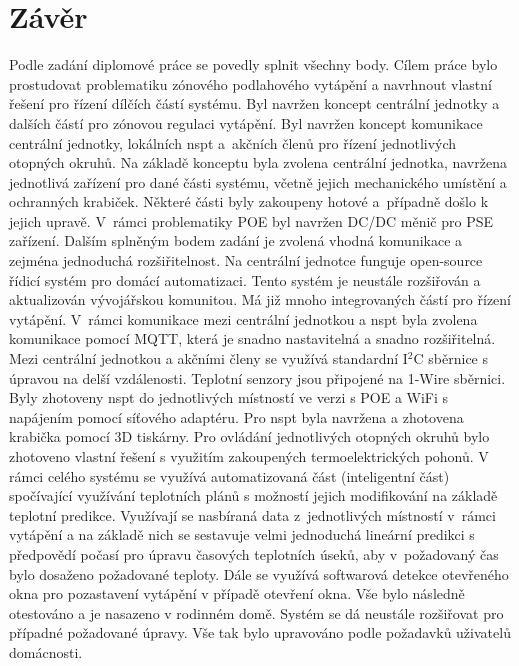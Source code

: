\chapter{Závěr}
Podle zadání diplomové práce se povedly splnit všechny body. Cílem práce bylo prostudovat problematiku zónového podlahového vytápění a navrhnout vlastní řešení pro řízení dílčích částí systému. Byl navržen koncept centrální jednotky a dalších částí pro zónovou regulaci vytápění. Byl navržen koncept komunikace centrální jednotky, lokálních \acrshort{nspt} a~akčních členů pro řízení jednotlivých otopných okruhů. Na základě konceptu byla zvolena centrální jednotka, navržena jednotlivá zařízení pro dané části systému, včetně jejich mechanického umístění a ochranných krabiček. Některé části byly zakoupeny hotové a~případně došlo k jejich upravě. V~rámci problematiky POE byl navržen DC/DC měnič pro PSE zařízení. Dalším splněným bodem zadání je zvolená vhodná komunikace a zejména jednoduchá rozšiřitelnost. Na centrální jednotce funguje open-source řídicí systém pro domácí automatizaci. Tento systém je neustále rozšiřován a aktualizován vývojářskou komunitou. Má již mnoho integrovaných částí pro řízení vytápění. V~rámci komunikace mezi centrální jednotkou a \acrshort{nspt} byla zvolena komunikace pomocí MQTT, která je snadno nastavitelná a snadno rozšiřitelná. Mezi centrální jednotkou a akčními členy se využívá standardní I$^2$C sběrnice s úpravou na delší vzdálenosti. Teplotní senzory jsou připojené na 1-Wire sběrnici. Byly zhotoveny \acrshort{nspt} do jednotlivých místností ve verzi s POE a WiFi s napájením pomocí síťového adaptéru. Pro \acrshort{nspt} byla navržena a zhotovena krabička pomocí 3D tiskárny. Pro ovládání jednotlivých otopných okruhů bylo zhotoveno vlastní řešení s využitím zakoupených termoelektrických pohonů. V rámci celého systému se využívá automatizovaná část (inteligentní část) spočívající využívání teplotních plánů s možností jejich modifikování na základě teplotní predikce. Využívají se nasbíraná data z~jednotlivých místností v~rámci vytápění a na základě nich se sestavuje velmi jednoduchá lineární predikci s předpovědí počasí pro úpravu časových teplotních úseků, aby v~požadovaný čas bylo dosaženo požadované teploty. Dále se využívá softwarová detekce otevřeného okna pro pozastavení vytápění v případě otevření okna. Vše bylo následně otestováno a je nasazeno v rodinném domě. Systém se dá neustále rozšiřovat pro případné požadované úpravy. Vše tak bylo upravováno podle požadavků uživatelů domácnosti. 

